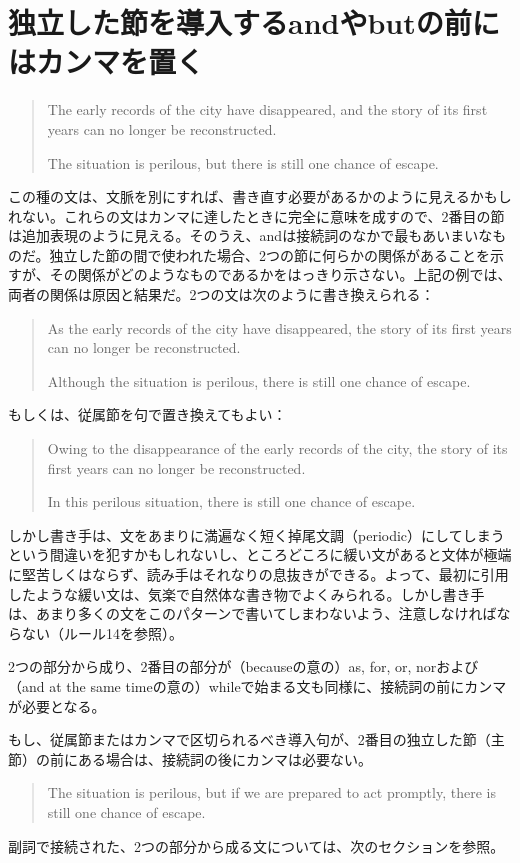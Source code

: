 \section{独立した節を導入するandやbutの前にはカンマを置く}
\begin{quote}
The early records of the city have disappeared, and the story of its
first years can no longer be reconstructed.

The situation is perilous, but there is still one chance of escape.    
\end{quote}
この種の文は、文脈を別にすれば、書き直す必要があるかのように見えるかもしれない。これらの文はカンマに達したときに完全に意味を成すので、2番目の節は追加表現のように見える。そのうえ、andは接続詞のなかで最もあいまいなものだ。独立した節の間で使われた場合、2つの節に何らかの関係があることを示すが、その関係がどのようなものであるかをはっきり示さない。上記の例では、両者の関係は原因と結果だ。2つの文は次のように書き換えられる：
\begin{quote}
As the early records of the city have disappeared, the story of its
first years can no longer be reconstructed.

Although the situation is perilous, there is still one chance of escape.    
\end{quote}
もしくは、従属節を句で置き換えてもよい：
\begin{quote}
Owing to the disappearance of the early records of the city, the story
of its first years can no longer be reconstructed.

In this perilous situation, there is still one chance of escape.    
\end{quote}
しかし書き手は、文をあまりに満遍なく短く掉尾文調（periodic）にしてしまうという間違いを犯すかもしれないし、ところどころに緩い文があると文体が極端に堅苦しくはならず、読み手はそれなりの息抜きができる。よって、最初に引用したような緩い文は、気楽で自然体な書き物でよくみられる。しかし書き手は、あまり多くの文をこのパターンで書いてしまわないよう、注意しなければならない（ルール14を参照）。
\par
2つの部分から成り、2番目の部分が（becauseの意の）as, for, or,
norおよび（and at the same
timeの意の）whileで始まる文も同様に、接続詞の前にカンマが必要となる。
\par
もし、従属節またはカンマで区切られるべき導入句が、2番目の独立した節（主節）の前にある場合は、接続詞の後にカンマは必要ない。
\begin{quote}
The situation is perilous, but if we are prepared to act promptly, there
is still one chance of escape.
\end{quote}
副詞で接続された、2つの部分から成る文については、次のセクションを参照。
